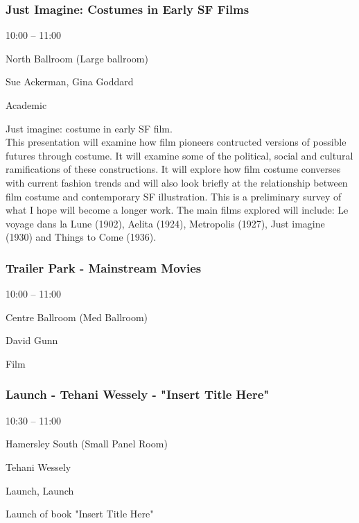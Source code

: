 \documentclass{scrreprt}
\begin{document}
\begin{multicols}{2}
\subsubsection*{Just Imagine: Costumes in Early SF Films}\begin{description}
\setlength{\itemsep}{0pt}
\setlength{\parsep}{0pt}
\setlength{\parskip}{0pt}
\item[Time:]{10:00 -- 11:00}
\item[Venue:]{North Ballroom (Large ballroom)}
\item[People:]{Sue Ackerman, Gina Goddard}
\item[Tags:]{Academic}\end{description}
Just imagine: costume in early SF film.\\This presentation will examine how film pioneers contructed versions of possible futures through costume. It will examine some of the political, social and cultural ramifications of these constructions. It will explore how film costume converses with current fashion trends  and will also look briefly at the relationship between film costume and contemporary SF illustration. This is a preliminary survey of what I hope will become a longer work. The main films explored will include:  Le voyage dans la Lune (1902),  Aelita (1924), Metropolis (1927), Just imagine (1930) and Things to Come (1936).
\subsubsection*{Trailer Park - Mainstream Movies}\begin{description}
\setlength{\itemsep}{0pt}
\setlength{\parsep}{0pt}
\setlength{\parskip}{0pt}
\item[Time:]{10:00 -- 11:00}
\item[Venue:]{Centre Ballroom (Med Ballroom)}
\item[People:]{David Gunn}
\item[Tags:]{Film}\end{description}

\subsubsection*{Launch - Tehani Wessely - "Insert Title Here"}\begin{description}
\setlength{\itemsep}{0pt}
\setlength{\parsep}{0pt}
\setlength{\parskip}{0pt}
\item[Time:]{10:30 -- 11:00}
\item[Venue:]{Hamersley South (Small Panel Room)}
\item[People:]{Tehani Wessely}
\item[Tags:]{Launch, Launch}\end{description}
Launch of book "Insert Title Here"

\end{multicols}
\end{document}
